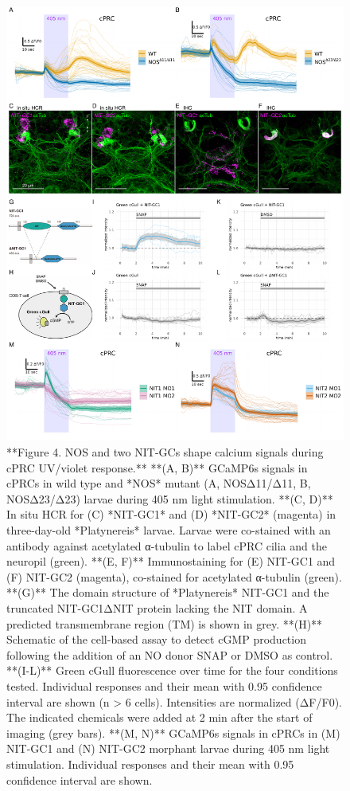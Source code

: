 \documentclass[
  10pt,
  onecolumn]{article}
\begin{document}
\begin{figure}
\includegraphics[width=38.89in]{figures/Fig4} \caption{**Figure 4. NOS and two NIT-GCs shape calcium signals during cPRC UV/violet response.** **(A, B)** GCaMP6s signals in cPRCs in wild type and *NOS* mutant (A, NOSΔ11/Δ11, B, NOSΔ23/Δ23) larvae during 405 nm light stimulation. **(C, D)** In situ HCR for (C) *NIT-GC1* and (D) *NIT-GC2* (magenta) in three-day-old *Platynereis* larvae. Larvae were co-stained with an antibody against acetylated α-tubulin to label cPRC cilia and the neuropil (green). **(E, F)** Immunostaining for (E) NIT-GC1 and (F) NIT-GC2 (magenta), co-stained for acetylated α-tubulin (green). **(G)** The domain structure of *Platynereis* NIT-GC1 and the truncated NIT-GC1ΔNIT protein lacking the NIT domain. A predicted transmembrane region (TM) is shown in grey. **(H)** Schematic of the cell-based assay to detect cGMP production following the addition of an NO donor SNAP or DMSO as control. **(I-L)** Green cGull fluorescence over time for the four conditions tested. Individual responses and their mean with 0.95 confidence interval are shown (n > 6 cells). Intensities are normalized (ΔF/F0). The indicated chemicals were added at 2 min after the start of imaging (grey bars). **(M, N)** GCaMP6s signals in cPRCs in (M) NIT-GC1 and (N) NIT-GC2 morphant larvae during 405 nm light stimulation. Individual responses and their mean with 0.95 confidence interval are shown.}\label{fig:unnamed-chunk-4}
\end{figure}
\end{document}
